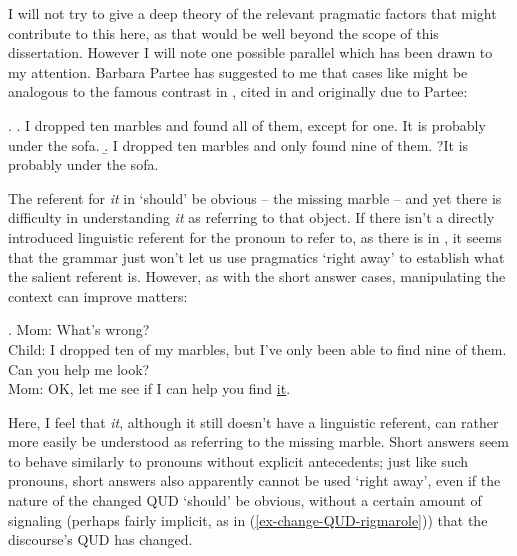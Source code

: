 \documentclass[11pt,letterpaper]{article}
\begin{document}
I will not try to give a deep theory of the relevant pragmatic factors that might contribute to this here, as that would be well beyond the scope of this dissertation.
However I will note one possible parallel which has been drawn to my attention.
Barbara Partee has suggested to me that cases like \Last might be analogous to the famous contrast in \Next, cited in \cite{Hei82} and originally due to Partee:

\ex.	\a. I dropped ten marbles and found all of them, except for one. It is probably under the sofa.
	\b. I dropped ten marbles and only found nine of them. ?It is probably under the sofa.
	
The referent for {\it it} in \Last[b] `should' be obvious -- the missing marble -- and yet there is difficulty in understanding {\it it} as referring to that object.
If there isn't a directly introduced linguistic referent for the pronoun to refer to, as there is in \Last[a], it seems that the grammar just won't let us use pragmatics `right away' to establish what the salient referent is.
However, as with the short answer cases, manipulating the context can improve matters:

\ex. 	Mom: What's wrong?\\
	Child: I dropped ten of my marbles, but I've only been able to find nine of them. Can you help me look?\\
	Mom: OK, let me see if I can help you find \underline{it}.
	
Here, I feel that {\it it}, although it still doesn't have a linguistic referent, can rather more easily be understood as referring to the missing marble.
Short answers seem to behave similarly to pronouns without explicit antecedents; just like such pronouns, short answers also apparently cannot be used `right away', even if the nature of the changed QUD `should' be obvious, without a certain amount of signaling (perhaps fairly implicit, as in (\ref{ex-change-QUD-rigmarole})) that the discourse's QUD has changed.
\end{document}
